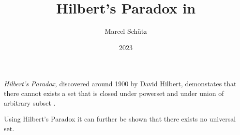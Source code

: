 \documentclass{stex}
\title{Hilbert's Paradox in \Naproche}
\author{Marcel Schütz}
\date{2023}
\begin{document}
\maketitle

\noindent \emph{Hilbert's Paradox}, discovered around 1900 by David Hilbert, demonstates that there cannot exists a set that is closed under powerset and under union of arbitrary subset \cite{PeckhausKahl2002}.


\noindent Using Hilbert's Paradox it can further be shown that there exists no universal set.


\printbibliography
\end{document}
